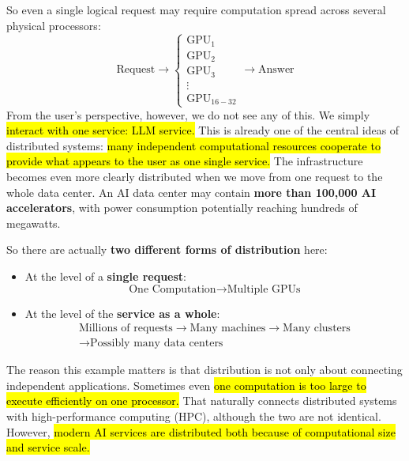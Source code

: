 \highspace
So even a single logical request may require computation spread across several physical processors:
\begin{equation*}
    \text{Request} \to
    \begin{cases}
        \text{GPU}_1 \\
        \text{GPU}_2 \\
        \text{GPU}_3 \\
        \vdots \\
        \text{GPU}_{16-32}
    \end{cases}
    \to \text{Answer}
\end{equation*}
From the user's perspective, however, we do not see any of this. We simply \hl{interact with one service: LLM service.} This is already one of the central ideas of distributed systems: \hl{many independent computational resources cooperate to provide what appears to the user as one single service.} The infrastructure becomes even more clearly distributed when we move from one request to the whole data center. An AI data center may contain \textbf{more than 100,000 AI accelerators}, with power consumption potentially reaching hundreds of megawatts.

\highspace
\textcolor{Green3}{} So there are actually \textbf{two different forms of distribution} here:
\begin{itemize}
    \item At the level of a \textbf{single request}:
        \begin{equation*}
            \text{One Computation} \to \text{Multiple GPUs}
        \end{equation*}
    \item At the level of the \textbf{service as a whole}:
        \begin{gather*}
            \text{Millions of requests} \to \text{Many machines} \to \text{Many clusters} \\
            \to \text{Possibly many data centers}
        \end{gather*}
\end{itemize}
The reason this example matters is that distribution is not only about connecting independent applications. Sometimes even \hl{one computation is too large to execute efficiently on one processor.} That naturally connects distributed systems with high-performance computing (HPC), although the two are not identical. However, \hl{modern AI services are distributed both because of computational size and service scale.}

